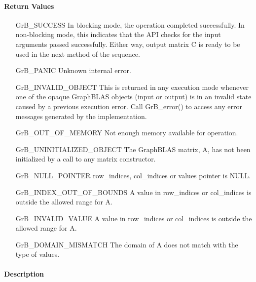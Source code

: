 \paragraph{Return Values}

\begin{itemize}[leftmargin=2.3in]
    \item[{\sf GrB\_SUCCESS}]         In blocking mode, the operation completed
    successfully. In non-blocking mode, this indicates that the API checks 
    for the input arguments passed successfully. Either way, output matrix 
    {\sf C} is ready to be used in the next method of the sequence.

    \item[{\sf GrB\_PANIC}]           Unknown internal error.
    
    \item[{\sf GrB\_INVALID\_OBJECT}] This is returned in any execution mode 
    whenever one of the opaque GraphBLAS objects (input or output) is in an invalid 
    state caused by a previous execution error.  Call {\sf GrB\_error()} to access 
    any error messages generated by the implementation.

    \item[{\sf GrB\_OUT\_OF\_MEMORY}] Not enough memory available for operation.
    
    \item[{\sf GrB\_UNINITIALIZED\_OBJECT}]  The GraphBLAS matrix, {\sf A}, has 
    not been initialized by a call to any matrix constructor.
    
    \item[{\sf GrB\_NULL\_POINTER}]  {\sf row\_indices}, 
    {\sf col\_indices} or {\sf values} pointer is {\sf NULL}.

    \item[{\sf GrB\_INDEX\_OUT\_OF\_BOUNDS}] A value in {\sf row\_indices} or
    {\sf col\_indices} is outside the allowed range for {\sf A}.

    \item[{\sf GrB\_INVALID\_VALUE}] A value in {\sf row\_indices} or
    {\sf col\_indices} is outside the allowed range for {\sf A}.

  \item[{\sf GrB\_DOMAIN\_MISMATCH}]    The domain of {\sf A} does not match
    with the type of {\sf values}.
\end{itemize}

\paragraph{Description}

